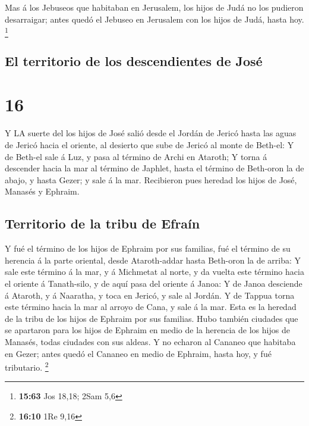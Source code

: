 Mas á los Jebuseos que habitaban en Jerusalem, los hijos
de Judá no los pudieron desarraigar; antes quedó el Jebuseo en Jerusalem
con los hijos de Judá, hasta hoy. \footnote{\textbf{15:63} Jos 18,18;
  2Sam 5,6}

\hypertarget{el-territorio-de-los-descendientes-de-josuxe9}{%
\subsection{El territorio de los descendientes de
José}\label{el-territorio-de-los-descendientes-de-josuxe9}}

\hypertarget{section-15}{%
\section{16}\label{section-15}}

 Y LA suerte del los hijos de José salió desde el Jordán de
Jericó hasta las aguas de Jericó hacia el oriente, al desierto que sube
de Jericó al monte de Beth-el:  Y de Beth-el sale á Luz, y
pasa al término de Archi en Ataroth;  Y torna á descender
hacia la mar al término de Japhlet, hasta el término de Beth-oron la de
abajo, y hasta Gezer; y sale á la mar.  Recibieron pues
heredad los hijos de José, Manasés y Ephraim.

\hypertarget{territorio-de-la-tribu-de-efrauxedn}{%
\subsection{Territorio de la tribu de
Efraín}\label{territorio-de-la-tribu-de-efrauxedn}}

 Y fué el término de los hijos de Ephraim por sus familias,
fué el término de su herencia á la parte oriental, desde Ataroth-addar
hasta Beth-oron la de arriba:  Y sale este término á la mar,
y á Michmetat al norte, y da vuelta este término hacia el oriente á
Tanath-silo, y de aquí pasa del oriente á Janoa:  Y de Janoa
desciende á Ataroth, y á Naaratha, y toca en Jericó, y sale al Jordán.
 Y de Tappua torna este término hacia la mar al arroyo de
Cana, y sale á la mar. Esta es la heredad de la tribu de los hijos de
Ephraim por sus familias.  Hubo también ciudades que se
apartaron para los hijos de Ephraim en medio de la herencia de los hijos
de Manasés, todas ciudades con sus aldeas.  Y no echaron al
Cananeo que habitaba en Gezer; antes quedó el Cananeo en medio de
Ephraim, hasta hoy, y fué tributario. \footnote{\textbf{16:10} 1Re 9,16}

